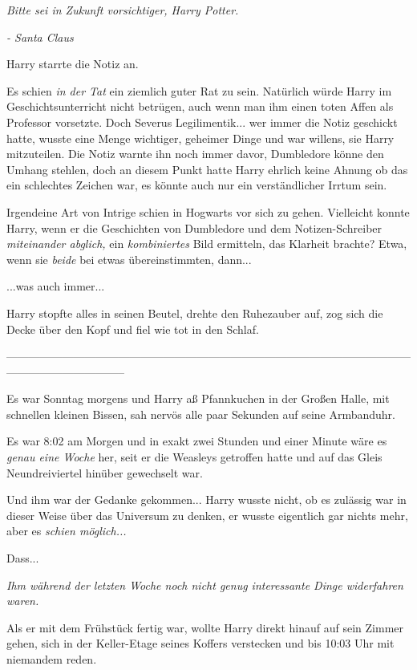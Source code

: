 {\emph{Bitte sei in Zukunft vorsichtiger, Harry Potter.}

\emph{- Santa Claus}

Harry starrte die Notiz an.

Es schien \emph{in der Tat} ein ziemlich guter Rat zu sein. Natürlich würde Harry im Geschichtsunterricht nicht betrügen, auch wenn man ihm einen toten Affen als Professor vorsetzte. Doch Severus Legilimentik... wer immer die Notiz geschickt hatte, wusste eine Menge wichtiger, geheimer Dinge und war willens, sie Harry mitzuteilen. Die Notiz warnte ihn noch immer davor, Dumbledore könne den Umhang stehlen, doch an diesem Punkt hatte Harry ehrlich keine Ahnung ob das ein schlechtes Zeichen war, es könnte auch nur ein verständlicher Irrtum sein.

Irgendeine Art von Intrige schien in Hogwarts vor sich zu gehen. Vielleicht konnte Harry, wenn er die Geschichten von Dumbledore und dem Notizen-Schreiber \emph{miteinander abglich,} ein \emph{kombiniertes} Bild ermitteln, das Klarheit brachte? Etwa, wenn sie \emph{beide} bei etwas übereinstimmten, dann...

...was auch immer...

Harry stopfte alles in seinen Beutel, drehte den Ruhezauber auf, zog sich die Decke über den Kopf und fiel wie tot in den Schlaf.

--------------------------------------------------------------------------------------------------------------------------------------------

\hfill\break Es war Sonntag morgens und Harry aß Pfannkuchen in der Großen Halle, mit schnellen kleinen Bissen, sah nervös alle paar Sekunden auf seine Armbanduhr.

Es war 8:02 am Morgen und in exakt zwei Stunden und einer Minute wäre es \emph{genau eine Woche} her, seit er die Weasleys getroffen hatte und auf das Gleis Neundreiviertel hinüber gewechselt war.

Und ihm war der Gedanke gekommen... Harry wusste nicht, ob es zulässig war in dieser Weise über das Universum zu denken, er wusste eigentlich gar nichts mehr, aber es \emph{schien möglich...}

Dass...

\emph{Ihm während der letzten Woche noch nicht genug interessante Dinge widerfahren waren.}

Als er mit dem Frühstück fertig war, wollte Harry direkt hinauf auf sein Zimmer gehen, sich in der Keller-Etage seines Koffers verstecken und bis 10:03 Uhr mit niemandem reden.

}
